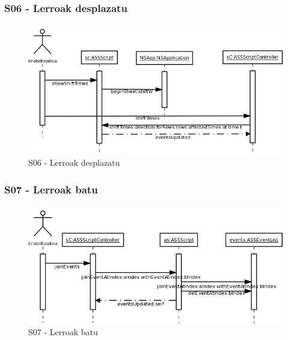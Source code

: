 \subsubsection{S06 - Lerroak desplazatu}
\begin{figure}[htp]
\begin{center}
\includegraphics[scale=0.35]{Pictures/Chapter4/Diseinua/S06.png}
\caption{S06 - Lerroak desplazatu}
\label{s06d}
\end{center}
\end{figure}


\subsubsection{S07 - Lerroak batu}
\begin{figure}[htp]
\begin{center}
\includegraphics[scale=0.35]{Pictures/Chapter4/Diseinua/S07.png}
\caption{S07 - Lerroak batu}
\label{s07d}
\end{center}
\end{figure}

\newpage

